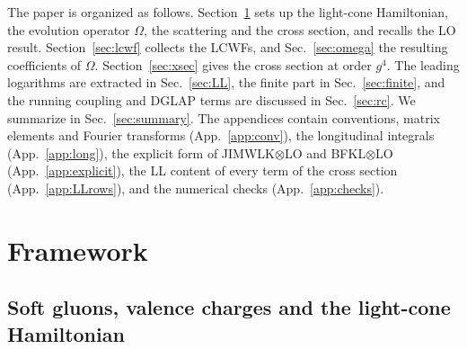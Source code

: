 \documentclass[aps,prd,onecolumn,superscriptaddress,nofootinbib,floatfix,longbibliography,11pt]{revtex4-2}
\numberwithin{equation}{section}
\begin{document}
The paper is organized as follows. Section~\ref{sec:framework} sets up the light-cone Hamiltonian, the evolution operator $\Omega$, the scattering and the cross section, and recalls the LO result. Section~\ref{sec:lcwf} collects the LCWFs, and Sec.~\ref{sec:omega} the resulting coefficients of $\Omega$. Section~\ref{sec:xsec} gives the cross section at order $g^4$. The leading logarithms are extracted in Sec.~\ref{sec:LL}, the finite part in Sec.~\ref{sec:finite}, and the running coupling and DGLAP terms are discussed in Sec.~\ref{sec:rc}. We summarize in Sec.~\ref{sec:summary}. The appendices contain conventions, matrix elements and Fourier transforms (App.~\ref{app:conv}), the longitudinal integrals (App.~\ref{app:long}), the explicit form of JIMWLK$\otimes$LO and BFKL$\otimes$LO (App.~\ref{app:explicit}), the LL content of every term of the cross section (App.~\ref{app:LLrows}), and the numerical checks (App.~\ref{app:checks}).
\section{Framework}\label{sec:framework}

\subsection{Soft gluons, valence charges and the light-cone Hamiltonian}\label{sec:hamiltonian}
\end{document}
